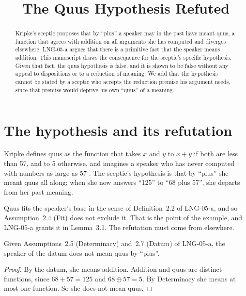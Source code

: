 \documentclass{situationist-preprint}
\title{The Quus Hypothesis Refuted}
\begin{document}
\maketitle

\begin{abstract}
Kripke's sceptic proposes that by \enquote{plus} a speaker may in the past have meant quus, a function that agrees with addition on all arguments she has computed and diverges elsewhere. LNG-05-a argues that there is a primitive fact that the speaker means addition. This manuscript draws the consequence for the sceptic's specific hypothesis. Given that fact, the quus hypothesis is false, and it is shown to be false without any appeal to dispositions or to a reduction of meaning. We add that the hypothesis cannot be stated by a sceptic who accepts the reduction premise his argument needs, since that premise would deprive his own \enquote{quus} of a meaning.
\end{abstract}

\section{The hypothesis and its refutation}

Kripke defines quus as the function that takes $x$ and $y$ to $x+y$ if both are less than 57, and to 5 otherwise, and imagines a speaker who has never computed with numbers as large as 57 \citep{Kripke1982}. The sceptic's hypothesis is that by \enquote{plus} she meant quus all along; when she now answers \enquote{125} to \enquote{68 plus 57}, she departs from her past meaning.

Quus fits the speaker's base in the sense of Definition~2.2 of LNG-05-a, and so Assumption~2.4 (Fit) does not exclude it. That is the point of the example, and LNG-05-a grants it in Lemma~3.1. The refutation must come from elsewhere.

\begin{proposition}\label{p:refute}
Given Assumptions~2.5 (Determinacy) and~2.7 (Datum) of LNG-05-a, the speaker of the datum does not mean quus by \enquote{plus}.
\end{proposition}

\begin{proof}
By the datum, she means addition. Addition and quus are distinct functions, since $68 + 57 = 125$ and $68 \oplus 57 = 5$. By Determinacy she means at most one function. So she does not mean quus.
\end{proof}
\end{document}
